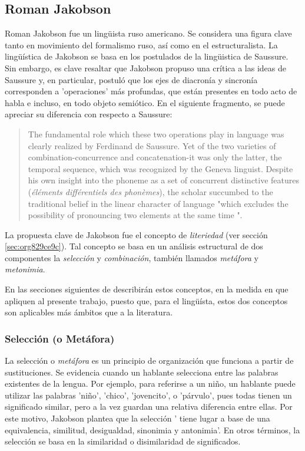 \documentclass[12pt,letterpaper,twoside]{article}
\begin{document}
\subsection{Roman Jakobson}
\label{sec:orgc6baa74}

Roman Jakobson fue un lingüista ruso americano. Se considera una
figura clave tanto en movimiento del formalismo ruso, así como en
el estructuralista.  La lingüística de Jakobson se basa en los
postulados de la lingüistica de Saussure. Sin embargo, es clave
resaltar que Jakobson propuso una crítica a las ideas de Saussure
y, en particular, postuló que los ejes de diacronía y sincronía
corresponden a 'operaciones' más profundas, que están presentes en
todo acto de habla e incluso, en todo objeto semiótico. En el
siguiente fragmento, se puede apreciar su diferencia con respecto
a Saussure:

\begin{quote}
The fundamental role which these two operations play in language
was clearly realized by Ferdinand de Saussure. Yet of the two
varieties of combination-concurrence and concatenation-it was only
the latter, the temporal sequence, which was recognized by the
Geneva linguist. Despite his own insight into the phoneme as a set
of concurrent distinctive features (\emph{éléments différentiels
des phonèmes}), the scholar succumbed to the traditional belief
in the linear character of language "which excludes the
possibility of pronouncing two elements at the same time ".
\cite[99]{jakobson1956two}
\end{quote}

La propuesta clave de Jakobson fue el concepto de \emph{literiedad}
(ver sección \ref{sec:org829ce9c}). Tal concepto se basa en un análisis
estructural de dos componentes la \emph{selección} y \emph{combinación},
también llamados \emph{metáfora} y \emph{metonimia}.

En las secciones siguientes de describirán estos conceptos, en la
medida en que apliquen al presente trabajo, puesto que, para el
lingüísta, estos dos conceptos son aplicables más ámbitos que a la
literatura.


\subsubsection{Selección (o Metáfora)}
\label{sec:org6a0ecd9}

La selección o \emph{metáfora} es un principio de organización que
funciona a partir de  sustituciones. Se evidencia cuando un hablante
selecciona entre las palabras existentes de la lengua.  Por
ejemplo, para referirse a un niño, un hablante puede utilizar las
palabras 'niño', 'chico', 'jovencito', o 'párvulo', pues todas
tienen un significado similar, pero a la vez guardan una relativa
diferencia entre ellas.  Por este motivo, Jakobson
\cite[pg. 128]{jakobson1981linguistica} plantea que la selección '
tiene lugar a base de una equivalencia, similitud, desigualdad,
sinonimia y antonimia'. En otros términos, la selección se basa en
la similaridad o disimilaridad de significados.
\end{document}
